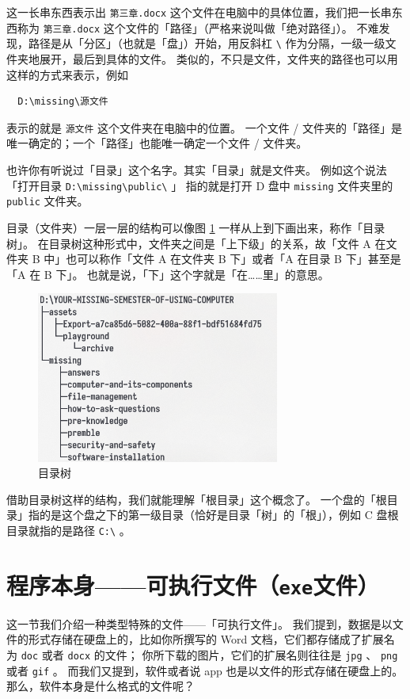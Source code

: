 这一长串东西表示出 \verb|第三章.docx| 这个文件在电脑中的具体位置，我们把一长串东西称为 \verb|第三章.docx| 这个文件的「路径」（严格来说叫做「绝对路径」）。
不难发现，路径是从「分区」（也就是「盘」）开始，用反斜杠 \verb|\| 作为分隔，一级一级文件夹地展开，最后到具体的文件。
类似的，不只是文件，文件夹的路径也可以用这样的方式来表示，例如

\begin{verbatim}
  D:\missing\源文件
\end{verbatim}

表示的就是 \verb|源文件| 这个文件夹在电脑中的位置。
一个文件 / 文件夹的「路径」是唯一确定的；一个「路径」也能唯一确定一个文件 / 文件夹。

也许你有听说过「目录」这个名字。其实「目录」就是文件夹。
例如这个说法「打开目录 \verb|D:\missing\public\| 」 指的就是打开 D 盘中 \verb|missing| 文件夹里的 \verb|public| 文件夹。

目录（文件夹）一层一层的结构可以像图 \ref{Catalog_Tree} 一样从上到下画出来，称作「目录树」。
在目录树这种形式中，文件夹之间是「上下级」的关系，故「文件 A 在文件夹 B 中」也可以称作「文件 A 在文件夹 B 下」或者「A 在目录 B 下」甚至是「A 在 B 下」。
也就是说，「下」这个字就是「在……里」的意思。

\begin{figure}[htb!]
  \centering
  \includegraphics[width=8cm]{assets/Catalog_Tree.png}
  \caption{目录树}
  \label{Catalog_Tree}
\end{figure}

借助目录树这样的结构，我们就能理解「根目录」这个概念了。
一个盘的「根目录」指的是这个盘之下的第一级目录（恰好是目录「树」的「根」），例如 C 盘根目录就指的是路径 \verb|C:\| 。

\section{程序本身——可执行文件（\texttt{exe}文件）}

这一节我们介绍一种类型特殊的文件——「可执行文件」。
我们提到，数据是以文件的形式存储在硬盘上的，比如你所撰写的 Word 文档，它们都存储成了扩展名为 \verb|doc| 或者 \verb|docx| 的文件；
你所下载的图片，它们的扩展名则往往是 \verb|jpg| 、 \verb|png| 或者 \verb|gif| 。
而我们又提到，软件或者说 app 也是以文件的形式存储在硬盘上的。
那么，软件本身是什么格式的文件呢？

